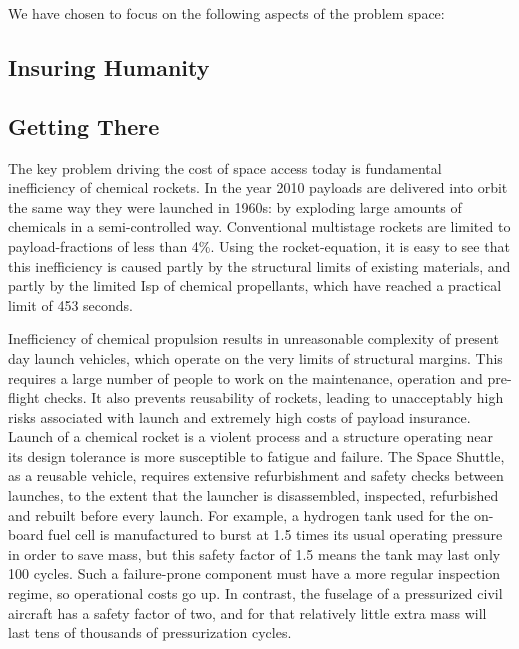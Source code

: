 \documentclass[letter,11pt]{article}
\begin{document}
We have chosen to focus on the following aspects of the problem space:

\subsection{Insuring Humanity}
\label{ps-insuring-humanity}

\subsection{Getting There}
\label{ps-getting-there}

The key problem driving the cost of space access today is fundamental
inefficiency of chemical rockets. In the year 2010 payloads are delivered into
orbit the same way they were launched in 1960s: by exploding large amounts of
chemicals in a semi-controlled way. Conventional multistage rockets are limited
to \glspl{payload-fraction} of less than 4\%. Using the \gls{rocket-equation},
it is easy to see that this inefficiency is caused partly by the structural
limits of existing materials, and partly by the limited \gls{Isp} of chemical
propellants, which have reached a practical limit of 453 seconds. 
 
Inefficiency of chemical propulsion results in unreasonable complexity of
present day launch vehicles, which operate on the very limits of structural
margins. This requires a large number of people to work on the maintenance,
operation and pre-flight checks.  It also prevents reusability of rockets,
leading to unacceptably high risks associated with launch and extremely high
costs of payload insurance. Launch of a chemical rocket is a violent process
and a structure operating near its design tolerance is more susceptible to
fatigue and failure. The Space Shuttle, as a reusable vehicle, requires
extensive refurbishment and safety checks between launches, to the extent that
the launcher is disassembled, inspected, refurbished and rebuilt before every
launch. For example, a hydrogen tank used for the on-board fuel cell is
manufactured to burst at 1.5 times its usual operating pressure in order to
save mass, but this safety factor of 1.5 means the tank may last only 100
cycles. Such a failure-prone component must have a more regular inspection
regime, so operational costs go up. In contrast, the fuselage of a pressurized
civil aircraft has a safety factor of two, and for that relatively little extra
mass will last tens of thousands of pressurization cycles. 
 
\end{document}
